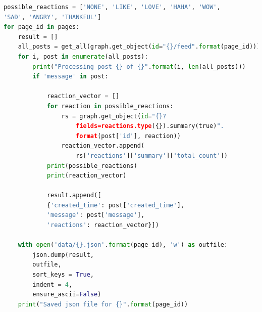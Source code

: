 \documentclass[
10pt, %
a4paper, %
oneside, %
headinclude,footinclude, %
BCOR5mm, %
]{scrartcl}
\begin{document}
\begin{lstlisting}[language=Python]
possible_reactions = ['NONE', 'LIKE', 'LOVE', 'HAHA', 'WOW',
'SAD', 'ANGRY', 'THANKFUL']
for page_id in pages:
    result = []
    all_posts = get_all(graph.get_object(id="{}/feed".format(page_id)))
    for i, post in enumerate(all_posts):
        print("Processing post {} of {}".format(i, len(all_posts)))
        if 'message' in post:
            
            reaction_vector = []
            for reaction in possible_reactions:
                rs = graph.get_object(id="{}?
                	fields=reactions.type({}).summary(true)".
                	format(post['id'], reaction))
                reaction_vector.append(
                	rs['reactions']['summary']['total_count'])
            print(possible_reactions)
            print(reaction_vector)
                
            result.append([
            {'created_time': post['created_time'], 
            'message': post['message'], 
            'reactions': reaction_vector}])

    with open('data/{}.json'.format(page_id), 'w') as outfile:
        json.dump(result, 
        outfile, 
        sort_keys = True, 
        indent = 4, 
        ensure_ascii=False)
    print("Saved json file for {}".format(page_id))
\end{lstlisting}
\clearpage
\end{document}
